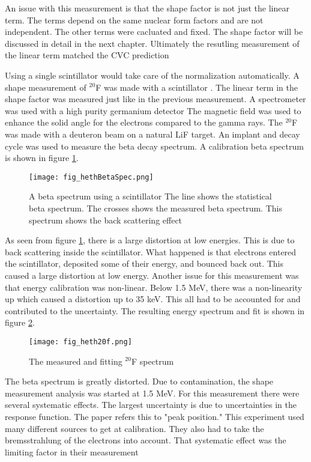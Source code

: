\documentclass[main.tex]{subfiles}
\begin{document}
An issue with this measurement is that the shape factor is not just the linear term.
The terms depend on the same nuclear form factors and are not independent.
The other terms were cacluated and fixed.
The shape factor will be discussed in detail in the next chapter.
Ultimately the resutling measurement of the linear term matched the CVC prediction


Using a single scintillator would take care of the normalization automatically. 
A shape measurement of $^{20}$F was made with a scintillator \cite{Het89}.
The linear term in the shape factor was measured just like in the previous measurement.
A spectrometer was used with a high purity germanium detector
The magnetic field was used to enhance the solid angle for the electrons compared to the gamma rays.
The $^{20}$F was made with a deuteron beam on a natural LiF target. 
An implant and decay cycle was used to measure the beta decay spectrum. 
A calibration beta spectrum is shown in figure \ref{fig:hethspec}.

\begin{figure}[!htb]
	\centerline{\texttt{[image: fig\_hethBetaSpec.png]}}
	\caption{A beta spectrum using a scintillator \cite{Het89}
		    The line shows the statistical beta spectrum.
		    The crosses shows the measured beta spectrum.
		    This spectrum shows the back scattering effect}
	\label{fig:hethspec}
\end{figure}

As seen from figure \ref{fig:hethspec}, there is a large distortion at low energies.
This is due to back scattering inside the scintillator.
What happened is that electrons entered the scintillator, deposited some of their energy, and bounced back out.
This caused a large distortion at low energy.
Another issue for this measurement was that energy calibration was non-linear.
Below 1.5 MeV, there was a non-linearity up which caused a distortion up to 35 keV. 
This all had to be accounted for and contributed to the uncertainty.
The resulting energy spectrum and fit is shown in figure \ref{fig:heth20Fspec}.

\begin{figure}[!htb]
	\centerline{\texttt{[image: fig\_heth20f.png]}}
	\caption{The measured and fitting $^{20}$F spectrum \cite{Het89}}
	\label{fig:heth20Fspec}
\end{figure}

The beta spectrum is greatly distorted.
Due to contamination, the shape measurement analysis was started at 1.5 MeV.
For this measurement there were several systematic effects.
The largest uncertainty is due to uncertainties in the response function.
The paper refers this to "peak position." 
This experiment used many different sources to get at calibration.
They also had to take the bremsstrahlung of the electrons into account.
That systematic effect was the limiting factor in their measurement
\end{document}
